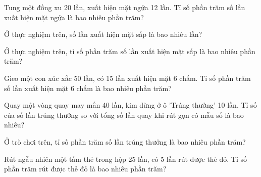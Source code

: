 
\begin{ex}
  Tung một đồng xu 20 lần, xuất hiện mặt ngửa 12 lần. Tỉ số phần trăm số lần xuất hiện mặt ngửa là bao nhiêu phần trăm?
\end{ex}

\begin{ex}
  Ở thực nghiệm trên, số lần xuất hiện mặt sấp là bao nhiêu lần?
\end{ex}

\begin{ex}
  Ở thực nghiệm trên, tỉ số phần trăm số lần xuất hiện mặt sấp là bao nhiêu phần trăm?
\end{ex}

\begin{ex}
  Gieo một con xúc xắc 50 lần, có 15 lần xuất hiện mặt 6 chấm. Tỉ số phần trăm số lần xuất hiện mặt 6 chấm là bao nhiêu phần trăm?
\end{ex}

\begin{ex}
  Quay một vòng quay may mắn 40 lần, kim dừng ở ô 'Trúng thưởng' 10 lần. Tỉ số của số lần trúng thưởng so với tổng số lần quay khi rút gọn có mẫu số là bao nhiêu?
\end{ex}

\begin{ex}
  Ở trò chơi trên, tỉ số phần trăm số lần trúng thưởng là bao nhiêu phần trăm?
\end{ex}

\begin{ex}
  Rút ngẫu nhiên một tấm thẻ trong hộp 25 lần, có 5 lần rút được thẻ đỏ. Tỉ số phần trăm rút được thẻ đỏ là bao nhiêu phần trăm?
\end{ex}

